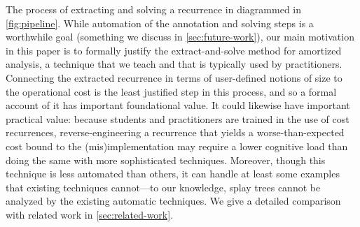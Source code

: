 The process of extracting and solving a recurrence in diagrammed in
\autoref{fig:pipeline}.
While automation of the annotation and solving steps
is a worthwhile goal (something we discuss in
\autoref{sec:future-work}),
our
main motivation in this paper is to formally justify the
extract-and-solve method for amortized analysis, a technique that we teach and that is
typically used by practitioners.  Connecting the extracted recurrence in
terms of user-defined notions of size to the operational cost is the
least justified step in this process, and so a formal account of it has
important foundational value.  It could likewise have important
practical value: because students and practitioners are trained in the
use of cost recurrences, reverse-engineering a recurrence that yields a
worse-than-expected cost bound to the (mis)implementation may require
a lower cognitive load than doing the same with more
sophisticated techniques.  Moreover, though this technique is less
automated than others, it can handle at least some examples that
existing techniques cannot---to our knowledge, splay trees cannot be
analyzed by the existing automatic techniques.
We give a detailed comparison with related work in \autoref{sec:related-work}.



